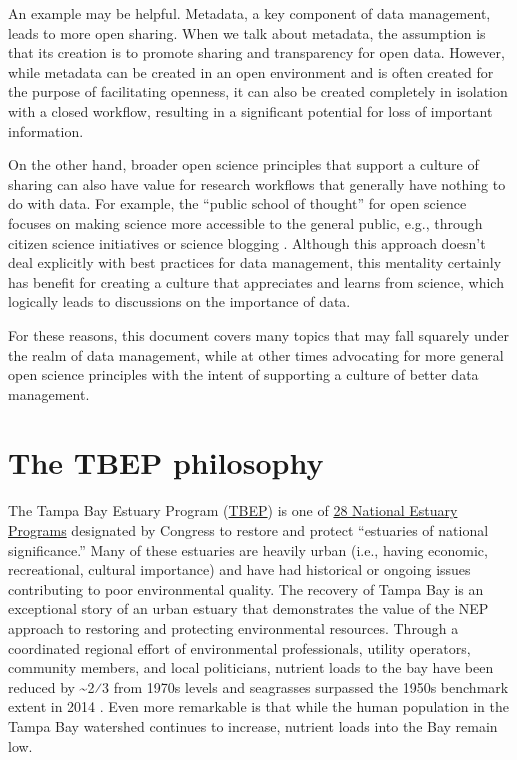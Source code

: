 \documentclass[
]{book}
\begin{document}
An example may be helpful. Metadata, a key component of data management, leads to more open sharing. When we talk about metadata, the assumption is that its creation is to promote sharing and transparency for open data. However, while metadata can be created in an open environment and is often created for the purpose of facilitating openness, it can also be created completely in isolation with a closed workflow, resulting in a significant potential for loss of important information.

On the other hand, broader open science principles that support a culture of sharing can also have value for research workflows that generally have nothing to do with data. For example, the ``public school of thought'' for open science focuses on making science more accessible to the general public, e.g., through citizen science initiatives or science blogging \citep{Fecher14}. Although this approach doesn't deal explicitly with best practices for data management, this mentality certainly has benefit for creating a culture that appreciates and learns from science, which logically leads to discussions on the importance of data.

For these reasons, this document covers many topics that may fall squarely under the realm of data management, while at other times advocating for more general open science principles with the intent of supporting a culture of better data management.

\section{The TBEP philosophy}\label{philogeneral}

The Tampa Bay Estuary Program (\href{https://www.tbep.org}{TBEP}) is one of \href{http://nationalestuaries.org/}{28 National Estuary Programs} designated by Congress to restore and protect ``estuaries of national significance.'' Many of these estuaries are heavily urban (i.e., having economic, recreational, cultural importance) and have had historical or ongoing issues contributing to poor environmental quality. The recovery of Tampa Bay is an exceptional story of an urban estuary that demonstrates the value of the NEP approach to restoring and protecting environmental resources. Through a coordinated regional effort of environmental professionals, utility operators, community members, and local politicians, nutrient loads to the bay have been reduced by \textasciitilde2⁄3 from 1970s levels and seagrasses surpassed the 1950s benchmark extent in 2014 \citep{Greening14, Sherwood17}. Even more remarkable is that while the human population in the Tampa Bay watershed continues to increase, nutrient loads into the Bay remain low.
\end{document}
